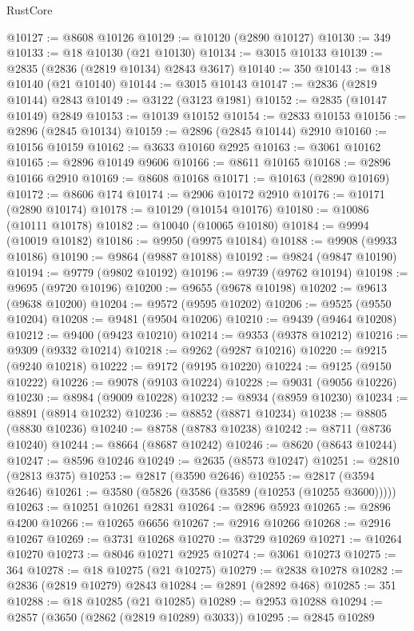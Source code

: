 \begin{lexlean}{RustCore}
\begin{coremodule}
@10127 := @8608 @10126
@10129 := @10120 (@2890 @10127)
@10130 := 349
@10133 := @18 @10130 (@21 @10130)
@10134 := @3015 @10133
@10139 := @2835 (@2836 (@2819 @10134) @2843 @3617)
@10140 := 350
@10143 := @18 @10140 (@21 @10140)
@10144 := @3015 @10143
@10147 := @2836 (@2819 @10144) @2843
@10149 := @3122 (@3123 @1981)
@10152 := @2835 (@10147 @10149) @2849
@10153 := @10139 @10152
@10154 := @2833 @10153
@10156 := @2896 (@2845 @10134)
@10159 := @2896 (@2845 @10144) @2910
@10160 := @10156 @10159
@10162 := @3633 @10160 @2925
@10163 := @3061 @10162
@10165 := @2896 @10149 @9606
@10166 := @8611 @10165
@10168 := @2896 @10166 @2910
@10169 := @8608 @10168
@10171 := @10163 (@2890 @10169)
@10172 := @8606 @174
@10174 := @2906 @10172 @2910
@10176 := @10171 (@2890 @10174)
@10178 := @10129 (@10154 @10176)
@10180 := @10086 (@10111 @10178)
@10182 := @10040 (@10065 @10180)
@10184 := @9994 (@10019 @10182)
@10186 := @9950 (@9975 @10184)
@10188 := @9908 (@9933 @10186)
@10190 := @9864 (@9887 @10188)
@10192 := @9824 (@9847 @10190)
@10194 := @9779 (@9802 @10192)
@10196 := @9739 (@9762 @10194)
@10198 := @9695 (@9720 @10196)
@10200 := @9655 (@9678 @10198)
@10202 := @9613 (@9638 @10200)
@10204 := @9572 (@9595 @10202)
@10206 := @9525 (@9550 @10204)
@10208 := @9481 (@9504 @10206)
@10210 := @9439 (@9464 @10208)
@10212 := @9400 (@9423 @10210)
@10214 := @9353 (@9378 @10212)
@10216 := @9309 (@9332 @10214)
@10218 := @9262 (@9287 @10216)
@10220 := @9215 (@9240 @10218)
@10222 := @9172 (@9195 @10220)
@10224 := @9125 (@9150 @10222)
@10226 := @9078 (@9103 @10224)
@10228 := @9031 (@9056 @10226)
@10230 := @8984 (@9009 @10228)
@10232 := @8934 (@8959 @10230)
@10234 := @8891 (@8914 @10232)
@10236 := @8852 (@8871 @10234)
@10238 := @8805 (@8830 @10236)
@10240 := @8758 (@8783 @10238)
@10242 := @8711 (@8736 @10240)
@10244 := @8664 (@8687 @10242)
@10246 := @8620 (@8643 @10244)
@10247 := @8596 @10246
@10249 := @2635 (@8573 @10247)
@10251 := @2810 (@2813 @375)
@10253 := @2817 (@3590 @2646)
@10255 := @2817 (@3594 @2646)
@10261 := @3580 (@5826 (@3586 (@3589 (@10253 (@10255 @3600)))))
@10263 := @10251 @10261 @2831
@10264 := @2896 @5923
@10265 := @2896 @4200
@10266 := @10265 @6656
@10267 := @2916 @10266
@10268 := @2916 @10267
@10269 := @3731 @10268
@10270 := @3729 @10269
@10271 := @10264 @10270
@10273 := @8046 @10271 @2925
@10274 := @3061 @10273
@10275 := 364
@10278 := @18 @10275 (@21 @10275)
@10279 := @2838 @10278
@10282 := @2836 (@2819 @10279) @2843
@10284 := @2891 (@2892 @468)
@10285 := 351
@10288 := @18 @10285 (@21 @10285)
@10289 := @2953 @10288
@10294 := @2857 (@3650 (@2862 (@2819 @10289) @3033))
@10295 := @2845 @10289

\end{coremodule}
\end{lexlean}
